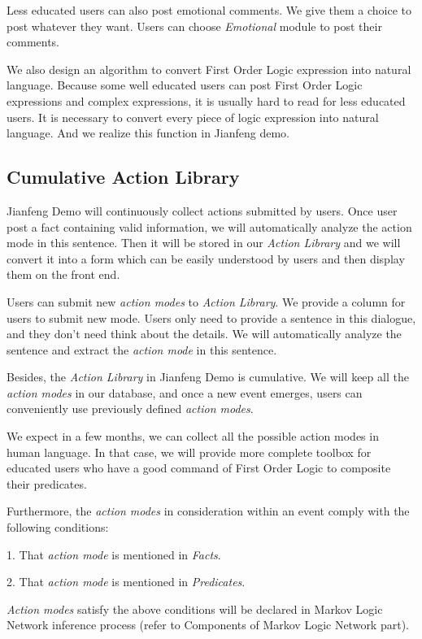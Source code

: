 \documentclass[
12pt, %
a4paper, %
oneside, %
headinclude,footinclude, %
BCOR5mm, %
]{scrartcl}
\begin{document}
Less educated users can also post emotional comments. We give them a choice to post whatever they want. Users can choose \textit{Emotional} module to post their comments. 

We also design an algorithm to convert First Order Logic expression into natural language. Because some well educated users can post First Order Logic expressions and complex expressions, it is usually hard to read for less educated users. It is necessary to convert every piece of logic expression into natural language. And we realize this function in Jianfeng demo.




\subsection{Cumulative Action Library}

Jianfeng Demo will continuously collect actions submitted by users. Once user post a fact containing valid information, we will automatically analyze the action mode in this sentence. Then it will be stored in our \textit{Action Library} and we will convert it into a form which can be easily understood by users and then display them on the front end.

Users can submit new \textit{action modes} to \textit{Action Library}. We provide a column for users to submit new mode. Users only need to provide a sentence in this dialogue, and they don't need think about the details. We will automatically analyze the sentence and extract the \textit{action mode} in this sentence. 

Besides, the \textit{Action Library} in Jianfeng Demo is cumulative. We will keep all the \textit{action modes} in our database, and once a new event emerges, users can conveniently use previously defined \textit{action modes}.

We expect in a few months, we can collect all the possible action modes in human language. In that case, we will provide more complete toolbox for educated users who have a good command of First Order Logic to composite their predicates.

Furthermore, the \textit{action modes} in consideration within an event comply with the following conditions:

1. That \textit{action mode} is mentioned in \textit{Facts}.

2. That \textit{action mode} is mentioned in \textit{Predicates}.

\textit{Action modes} satisfy the above conditions will be declared in Markov Logic Network inference process (refer to Components of Markov Logic Network part). 
\end{document}
